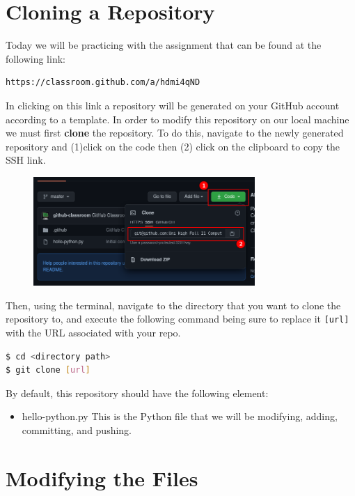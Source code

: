 \documentclass[a4paper,10pt]{article} %
\begin{document}
\section{Cloning a Repository}

Today we will be practicing with the assignment that can be found at the following link: \\
\begin{lstlisting}
https://classroom.github.com/a/hdmi4qND
\end{lstlisting}
In clicking on this link a repository will be generated on your GitHub account according to a template. In order to modify this repository on our local machine we must first \textbf{clone} the repository. To do this, navigate to the newly generated repository and  (1)click on the code then (2) click on the clipboard to copy the SSH link.
\begin{figure}[H]
  \centering
  \includegraphics[width=0.75\textwidth]{./imgs/cloning.png}
\end{figure}
Then, using the terminal, navigate to the directory that you want to clone the repository to, and execute the following command being sure to replace it \lstinline|[url]| with the URL associated with your repo.

\begin{lstlisting}[language=bash]
$ cd <directory path>
$ git clone [url]
\end{lstlisting}

By default, this repository should have the following element:
\begin{itemize}
  \item hello-python.py \textrightarrow This is the Python file that we will be modifying, adding, committing, and pushing.
\end{itemize}

\section{Modifying the Files}
\end{document}
